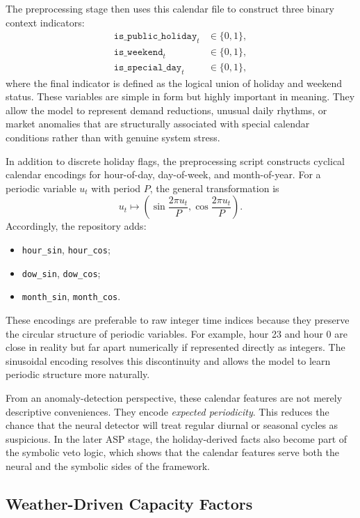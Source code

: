 The preprocessing stage then uses this calendar file to construct three binary context indicators:
\begin{align}
	\texttt{is\_public\_holiday}_t &\in \{0,1\}, \\
	\texttt{is\_weekend}_t &\in \{0,1\}, \\
	\texttt{is\_special\_day}_t &\in \{0,1\},
\end{align}
where the final indicator is defined as the logical union of holiday and weekend status. These variables are simple in form but highly important in meaning. They allow the model to represent demand reductions, unusual daily rhythms, or market anomalies that are structurally associated with special calendar conditions rather than with genuine system stress.

In addition to discrete holiday flags, the preprocessing script constructs cyclical calendar encodings for hour-of-day, day-of-week, and month-of-year. For a periodic variable $u_t$ with period $P$, the general transformation is
\begin{equation}
	u_t \mapsto \left(\sin\!\frac{2\pi u_t}{P}, \cos\!\frac{2\pi u_t}{P}\right).
	\label{eq:cyclical_encoding}
\end{equation}
Accordingly, the repository adds:
\begin{itemize}
	\item \texttt{hour\_sin}, \texttt{hour\_cos};
	\item \texttt{dow\_sin}, \texttt{dow\_cos};
	\item \texttt{month\_sin}, \texttt{month\_cos}.
\end{itemize}
These encodings are preferable to raw integer time indices because they preserve the circular structure of periodic variables. For example, hour 23 and hour 0 are close in reality but far apart numerically if represented directly as integers. The sinusoidal encoding resolves this discontinuity and allows the model to learn periodic structure more naturally.

From an anomaly-detection perspective, these calendar features are not merely descriptive conveniences. They encode \emph{expected periodicity}. This reduces the chance that the neural detector will treat regular diurnal or seasonal cycles as suspicious. In the later ASP stage, the holiday-derived facts also become part of the symbolic veto logic, which shows that the calendar features serve both the neural and the symbolic sides of the framework.

\subsection{Weather-Driven Capacity Factors}

